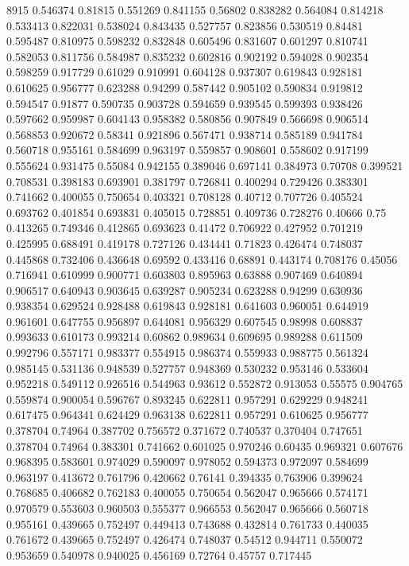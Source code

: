 8915
0.546374 0.81815
0.551269 0.841155
0.56802 0.838282
0.564084 0.814218
0.533413 0.822031
0.538024 0.843435
0.527757 0.823856
0.530519 0.84481
0.595487 0.810975
0.598232 0.832848
0.605496 0.831607
0.601297 0.810741
0.582053 0.811756
0.584987 0.835232
0.602816 0.902192
0.594028 0.902354
0.598259 0.917729
0.61029 0.910991
0.604128 0.937307
0.619843 0.928181
0.610625 0.956777
0.623288 0.94299
0.587442 0.905102
0.590834 0.919812
0.594547 0.91877
0.590735 0.903728
0.594659 0.939545
0.599393 0.938426
0.597662 0.959987
0.604143 0.958382
0.580856 0.907849
0.566698 0.906514
0.568853 0.920672
0.58341 0.921896
0.567471 0.938714
0.585189 0.941784
0.560718 0.955161
0.584699 0.963197
0.559857 0.908601
0.558602 0.917199
0.555624 0.931475
0.55084 0.942155
0.389046 0.697141
0.384973 0.70708
0.399521 0.708531
0.398183 0.693901
0.381797 0.726841
0.400294 0.729426
0.383301 0.741662
0.400055 0.750654
0.403321 0.708128
0.40712 0.707726
0.405524 0.693762
0.401854 0.693831
0.405015 0.728851
0.409736 0.728276
0.40666 0.75
0.413265 0.749346
0.412865 0.693623
0.41472 0.706922
0.427952 0.701219
0.425995 0.688491
0.419178 0.727126
0.434441 0.71823
0.426474 0.748037
0.445868 0.732406
0.436648 0.69592
0.433416 0.68891
0.443174 0.708176
0.45056 0.716941
0.610999 0.900771
0.603803 0.895963
0.63888 0.907469
0.640894 0.906517
0.640943 0.903645
0.639287 0.905234
0.623288 0.94299
0.630936 0.938354
0.629524 0.928488
0.619843 0.928181
0.641603 0.960051
0.644919 0.961601
0.647755 0.956897
0.644081 0.956329
0.607545 0.98998
0.608837 0.993633
0.610173 0.993214
0.60862 0.989634
0.609695 0.989288
0.611509 0.992796
0.557171 0.983377
0.554915 0.986374
0.559933 0.988775
0.561324 0.985145
0.531136 0.948539
0.527757 0.948369
0.530232 0.953146
0.533604 0.952218
0.549112 0.926516
0.544963 0.93612
0.552872 0.913053
0.55575 0.904765
0.559874 0.900054
0.596767 0.893245
0.622811 0.957291
0.629229 0.948241
0.617475 0.964341
0.624429 0.963138
0.622811 0.957291
0.610625 0.956777
0.378704 0.74964
0.387702 0.756572
0.371672 0.740537
0.370404 0.747651
0.378704 0.74964
0.383301 0.741662
0.601025 0.970246
0.60435 0.969321
0.607676 0.968395
0.583601 0.974029
0.590097 0.978052
0.594373 0.972097
0.584699 0.963197
0.413672 0.761796
0.420662 0.76141
0.394335 0.763906
0.399624 0.768685
0.406682 0.762183
0.400055 0.750654
0.562047 0.965666
0.574171 0.970579
0.553603 0.960503
0.555377 0.966553
0.562047 0.965666
0.560718 0.955161
0.439665 0.752497
0.449413 0.743688
0.432814 0.761733
0.440035 0.761672
0.439665 0.752497
0.426474 0.748037
0.54512 0.944711
0.550072 0.953659
0.540978 0.940025
0.456169 0.72764
0.45757 0.717445
